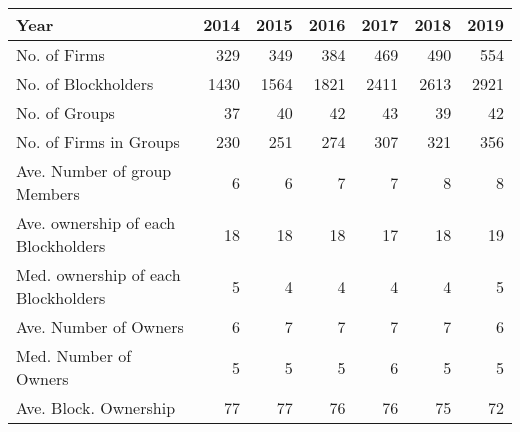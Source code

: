 \begin{tabular}{lrrrrrr}
\toprule
Year &  2014 &  2015 &  2016 &  2017 &  2018 &  2019 \\
\midrule
No. of Firms                        &   329 &   349 &   384 &   469 &   490 &   554 \\
No. of Blockholders                 &  1430 &  1564 &  1821 &  2411 &  2613 &  2921 \\
No. of Groups                       &    37 &    40 &    42 &    43 &    39 &    42 \\
No. of Firms in Groups              &   230 &   251 &   274 &   307 &   321 &   356 \\
Ave. Number of group Members        &     6 &     6 &     7 &     7 &     8 &     8 \\
Ave. ownership of each Blockholders &    18 &    18 &    18 &    17 &    18 &    19 \\
Med. ownership of each Blockholders &     5 &     4 &     4 &     4 &     4 &     5 \\
Ave. Number of Owners               &     6 &     7 &     7 &     7 &     7 &     6 \\
Med. Number of Owners               &     5 &     5 &     5 &     6 &     5 &     5 \\
Ave. Block. Ownership               &    77 &    77 &    76 &    76 &    75 &    72 \\
\bottomrule
\end{tabular}
